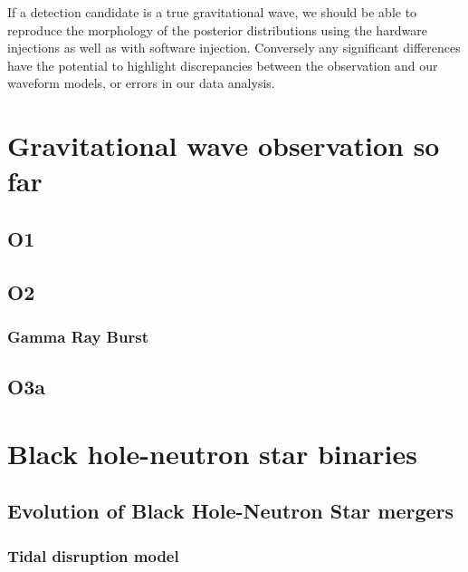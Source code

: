 \documentclass[binding=0.6cm, LaM]{sapthesis}
\begin{document}
	If a detection candidate is a true gravitational wave, 
	we should be able to reproduce the morphology of the posterior distributions 
	using the hardware injections as well as with software injection. 
	Conversely any significant differences have the potential to highlight 
	discrepancies between the observation and our waveform models, or errors in our data analysis. 
\chapter{Gravitational wave observation so far}

\section{O1}

\section{O2}

\subsection{Gamma Ray Burst}

\section{O3a}
\chapter{Black hole-neutron star binaries}



\section{Evolution of Black Hole-Neutron Star mergers}



\subsection{Tidal disruption model}
\end{document}
